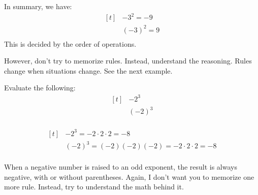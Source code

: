 In summary, we have:
\[
\begin{aligned}[t]
	&-3^{2}=-9 \\
	&(-3)^{2}=9 \\
\end{aligned}
\]
This is decided by the order of operations.

However, don't try to memorize rules. Instead, understand the reasoning. Rules change when situations change. See the next example.

\begin{myexample}
Evaluate the following:
\[
\begin{aligned}[t]
	&-2^{3} \\
	&(-2)^{3} \\
\end{aligned}
\]
\end{myexample}
\begin{solution}
\[
\begin{aligned}[t]
	&-2^{3}=-2\cdot2\cdot2=-8 \\
	&(-2)^{3}=(-2)(-2)(-2)=-2\cdot2\cdot2=-8 \\
\end{aligned}
\]
\end{solution}
When a negative number is raised to an odd exponent, the result is always negative, with or without parentheses. Again, I don't want you to memorize one more rule. Instead, try to understand the math behind it.


